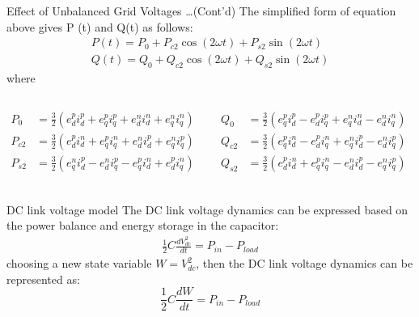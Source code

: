 \documentclass[aspectratio=169]{beamer}
\begin{document}
\begin{frame}{Effect of Unbalanced Grid Voltages \dots(Cont'd)}
    The simplified form of equation above gives P (t) and Q(t) as follows:
    \begin{equation*}
        \begin{gathered}
            P(t) = P_0 + P_{c2}\cos(2\omega t) + P_{s2}\sin(2\omega t) \\
            Q(t) = Q_0 + Q_{c2}\cos(2\omega t) + Q_{s2}\sin(2\omega t)        
        \end{gathered}
    \end{equation*}
    where
    \begin{columns}
        \begin{equation*}
            \begin{split}
                P_0 &= \frac{3}{2}(e_{d}^{p} i_{d}^{p} + e_{q}^{p} i_{q}^{p} + e_{d}^{n} i_{d}^{n} + e_{q}^{n} i_{q}^{n}) \\
                P_{c2} &= \frac{3}{2}(e_{d}^{p} i_{d}^{n} + e_{q}^{p} i_{q}^{n} + e_{d}^{n} i_{d}^{p} + e_{q}^{n} i_{q}^{p}) \\
                P_{s2} &= \frac{3}{2}(e_{q}^{n} i_{d}^{p} - e_{d}^{n} i_{q}^{p} - e_{q}^{p} i_{d}^{n} + e_{d}^{p} i_{q}^{n}) \\
            \end{split}
        \end{equation*}

        \begin{equation*}
            \begin{split}
                Q_0 &= \frac{3}{2}(e_{q}^{p} i_{d}^{p} - e_{d}^{p} i_{q}^{p} + e_{q}^{n} i_{d}^{n} - e_{d}^{n} i_{q}^{n}) \\
                Q_{c2} &= \frac{3}{2}(e_{q}^{p} i_{d}^{n} - e_{d}^{p} i_{q}^{n} + e_{q}^{n} i_{d}^{p} - e_{d}^{n} i_{q}^{p}) \\
                Q_{s2} &= \frac{3}{2}(e_{d}^{p} i_{d}^{n} + e_{q}^{p} i_{q}^{n} - e_{d}^{n} i_{d}^{p} - e_{q}^{n} i_{q}^{p})
            \end{split}
        \end{equation*}
    \end{columns}
\end{frame}

\begin{frame}{DC link voltage model}
    The DC link voltage dynamics can be expressed based on the power balance and energy storage in the capacitor:
    \begin{equation*}
        \begin{gathered}
            \frac{1}{2}C \frac{dV^{2}_{dc}}{dt} = P_{in} - P_{load}
        \end{gathered}
    \end{equation*}
    choosing a new state variable $W = V_{dc}^{2}$, then the DC link voltage dynamics can be represented as:
    \begin{equation*}
        \frac{1}{2}C \frac{dW}{dt} = P_{in} - P_{load}
    \end{equation*}
\end{frame}
\end{document}
